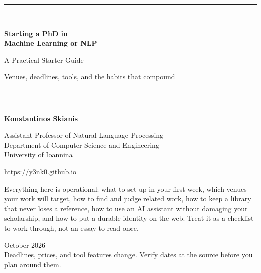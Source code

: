 \documentclass[11pt,a4paper]{article}
\begin{document}
\begin{titlepage}
\centering
\vspace*{2.2cm}
{\color{brandlight}\rule{\textwidth}{2pt}}\\[0.8cm]
{\Huge\bfseries\color{brand} Starting a PhD in\\[0.25cm] Machine Learning or NLP\par}
\vspace{0.7cm}
{\LARGE\color{ink} A Practical Starter Guide\par}
\vspace{0.5cm}
{\large\color{mutegray} Venues, deadlines, tools, and the habits that compound\par}
\vspace{0.6cm}
{\color{brandlight}\rule{\textwidth}{2pt}}\\[1.1cm]

{\large\bfseries\color{ink} Konstantinos Skianis\par}
\vspace{0.18cm}
{\normalsize\color{mutegray} Assistant Professor of Natural Language Processing\\[2pt]
Department of Computer Science and Engineering\\[2pt]
University of Ioannina\par}
\vspace{0.25cm}
{\footnotesize\color{brandlight}\url{https://y3nk0.github.io}\par}
\vspace{1.1cm}

\begin{minipage}{0.85\textwidth}
\small\color{ink}
Everything here is operational: what to set up in your first week, which venues
your work will target, how to find and judge related work, how to keep a
library that never loses a reference, how to use an AI assistant without
damaging your scholarship, and how to put a durable identity on the web.
Treat it as a checklist to work through, not an essay to read once.
\end{minipage}

\vfill
{\color{mutegray} October 2026}\\[0.3cm]
{\footnotesize\color{mutegray} Deadlines, prices, and tool features change.
Verify dates at the source before you plan around them.}
\end{titlepage}

\tableofcontents
\thispagestyle{fancy}
\clearpage
\end{document}
